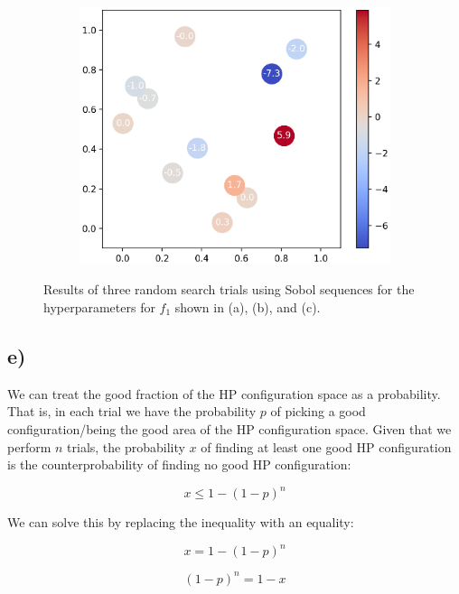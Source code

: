 \documentclass[11pt]{article}
\begin{document}
\begin{figure}[H]
\begin{subfigure}[b]{0.325\textwidth}
		\centering
		\includegraphics[width=\textwidth]{assets/1d-sobol-3rd}
		\caption{}
	\end{subfigure}

	\caption{Results of three random search trials using Sobol sequences for the hyperparameters for $f_1$ shown in (a), (b), and (c).}
	\label{fig:1d-sobol-random}
\end{figure}


\subsection{e)}\label{subsec:basic-e}

We can treat the good fraction of the HP configuration space as a probability. That is, in each trial we have the probability $p$ of picking a good configuration/being the good area of the HP configuration space. Given that we perform $n$ trials, the probability $x$ of finding at least one good HP configuration is the counterprobability of finding no good HP configuration:

\begin{equation}
	x \leq 1-(1-p)^n
\end{equation}

\noindent We can solve this by replacing the inequality with an equality:

\begin{equation}
	x = 1-(1-p)^n
\end{equation}

\begin{equation}
	(1-p)^n = 1-x
\end{equation}
\end{document}
